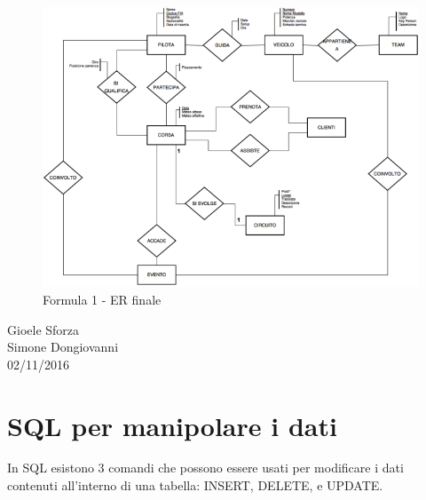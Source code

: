 \newpage
\begin{center}
\begin{figure}[H]
\centering
\includegraphics[scale=0.7]{figures/formula1_ER.png}
\caption{Formula 1 - ER finale} 
\end{figure}
\end{center}


\begin{flushright}Gioele Sforza\\Simone Dongiovanni\\02/11/2016\end{flushright}


\section{SQL per manipolare i dati}

In SQL esistono 3 comandi che possono essere usati per modificare i dati contenuti all’interno di una tabella: INSERT, DELETE, e UPDATE.

